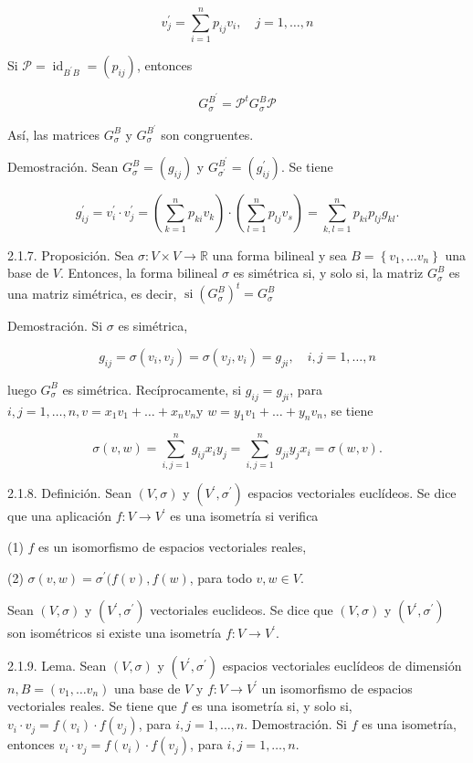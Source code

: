 \documentclass[12pt, a4paper, ones, notitlepage, openany,titlepage]{article}
\begin{document}
$$
v_{j}^{\prime}=\sum_{i=1}^{n} p_{i j} v_{i}, \quad j=1, \ldots, n
$$

Si $\mathcal{P}=\operatorname{id}_{B^{\prime} B}=\left(p_{i j}\right)$, entonces

$$
G_{\sigma}^{B^{\prime}}=\mathcal{P}^{t} G_{\sigma}^{B} \mathcal{P}
$$

Así, las matrices $G_{\sigma}^{B}$ y $G_{\sigma}^{B^{\prime}}$ son congruentes.

Demostración. Sean $G_{\sigma}^{B}=\left(g_{i j}\right)$ y $G_{\sigma^{\prime}}^{B^{\prime}}=\left(g_{i j}^{\prime}\right)$. Se tiene

$$
g_{i j}^{\prime}=v_{i}^{\prime} \cdot v_{j}^{\prime}=\left(\sum_{k=1}^{n} p_{k i} v_{k}\right) \cdot\left(\sum_{l=1}^{n} p_{l j} v_{s}\right)=\sum_{k, l=1}^{n} p_{k i} p_{l j} g_{k l} .
$$

2.1.7. Proposición. Sea $\sigma: V \times V \rightarrow \mathbb{R}$ una forma bilineal y sea $B=\left\{v_{1}, \ldots v_{n}\right\}$ una base de $V$. Entonces, la forma bilineal $\sigma$ es simétrica si, y solo si, la matriz $G_{\sigma}^{B}$ es una matriz simétrica, es decir, $\operatorname{si}\left(G_{\sigma}^{B}\right)^{t}=G_{\sigma}^{B}$

Demostración. Si $\sigma$ es simétrica,

$$
g_{i j}=\sigma\left(v_{i}, v_{j}\right)=\sigma\left(v_{j}, v_{i}\right)=g_{j i}, \quad i, j=1, \ldots, n
$$

luego $G_{\sigma}^{B}$ es simétrica. Recíprocamente, si $g_{i j}=g_{j i}$, para $i, j=1, \ldots, n, v=x_{1} v_{1}+\ldots+x_{n} v_{n} \mathrm{y}$ $w=y_{1} v_{1}+\ldots+y_{n} v_{n}$, se tiene

$$
\sigma(v, w)=\sum_{i, j=1}^{n} g_{i j} x_{i} y_{j}=\sum_{i, j=1}^{n} g_{j i} y_{j} x_{i}=\sigma(w, v) .
$$

2.1.8. Definición. Sean $(V, \sigma)$ y $\left(V^{\prime}, \sigma^{\prime}\right)$ espacios vectoriales euclídeos. Se dice que una aplicación $f: V \rightarrow V^{\prime}$ es una isometría si verifica

(1) $f$ es un isomorfismo de espacios vectoriales reales,

(2) $\sigma(v, w)=\sigma^{\prime}(f(v), f(w)$, para todo $v, w \in V$.

Sean $(V, \sigma)$ y $\left(V^{\prime}, \sigma^{\prime}\right)$ vectoriales euclideos. Se dice que $(V, \sigma)$ y $\left(V^{\prime}, \sigma^{\prime}\right)$ son isométricos si existe una isometría $f: V \rightarrow V^{\prime}$.

2.1.9. Lema. Sean $(V, \sigma)$ y $\left(V^{\prime}, \sigma^{\prime}\right)$ espacios vectoriales euclídeos de dimensión $n, B=\left(v_{1}, \ldots v_{n}\right)$ una base de $V$ y $f: V \rightarrow V^{\prime}$ un isomorfismo de espacios vectoriales reales. Se tiene que $f$ es una isometría si, y solo si, $v_{i} \cdot v_{j}=f\left(v_{i}\right) \cdot f\left(v_{j}\right)$, para $i, j=1, \ldots, n$. Demostración. Si $f$ es una isometría, entonces $v_{i} \cdot v_{j}=f\left(v_{i}\right) \cdot f\left(v_{j}\right)$, para $i, j=1, \ldots, n$.
\end{document}

